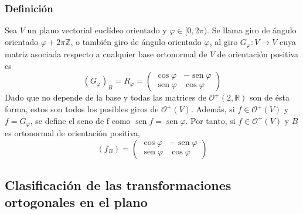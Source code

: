 \documentclass[12pt, a4paper, ones, notitlepage, openany,titlepage]{article}
\begin{document}
\subsubsection{Definición}
Sea $V$ un plano vectorial euclídeo orientado y $\varphi \in[0,2 \pi)$. Se llama giro de ángulo orientado $\varphi+2 \pi \mathbb{Z}$, o también giro de ángulo orientado $\varphi$, al giro $G_{\varphi}: V \rightarrow V$ cuya matriz asociada respecto a cualquier base ortonormal de $V$ de orientación positiva es
$$
\left(G_{\varphi}\right)_{B}=R_{\varphi}=\left(\begin{array}{rr}
	\cos \varphi & -\operatorname{sen} \varphi \\
	\operatorname{sen} \varphi & \cos \varphi
\end{array}\right)
$$
Dado que no depende de la base y todas las matrices de $\mathcal{O}^+(2,\mathbb{R})$ son de ésta forma, estos son todos los posibles giros de $\mathcal{O}^+(V)$. Además, si $f \in \mathcal{O}^+(V)$ y $f = G_\varphi$, se define el seno de f como $\operatorname{sen}f = \operatorname{sen}\varphi$. Por tanto, si $f \in \mathcal{O}^+(V)$ y $B$ es ortonormal de orientación positiva,
$$
(f_B) =
\begin{pmatrix}
	\operatorname{cos}\varphi & -\operatorname{sen}\varphi \\
	\operatorname{sen}\varphi & \operatorname{cos}\varphi
\end{pmatrix}
$$

\subsection{Clasificación de las transformaciones ortogonales en el plano}
\end{document}
